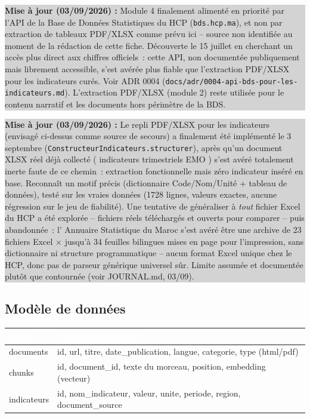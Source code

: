 \documentclass[11pt,a4paper]{article}
\newcommand{\tblhead}[1]{\textcolor{white}{\textbf{#1}}}
\newcommand{\majcadrage}[1]{%
\par\vspace{0.35cm}
\noindent\colorbox{lightgrey}{%
\begin{minipage}{\dimexpr\linewidth-2\fboxsep}
\vspace{0.15cm}
\textbf{\color{gold}Mise \`a jour (03/09/2026) :} #1
\vspace{0.15cm}
\end{minipage}%
}
\vspace{0.35cm}
}
\begin{document}
\majcadrage{Module 4 finalement aliment\'e en priorit\'e par l'API de la Base de Donn\'ees Statistiques du HCP (\texttt{bds.hcp.ma}), et non par extraction de tableaux PDF/XLSX comme pr\'evu ici -- source non identifi\'ee au moment de la r\'edaction de cette fiche. D\'ecouverte le 15 juillet en cherchant un acc\`es plus direct aux chiffres officiels~: cette API, non document\'ee publiquement mais librement accessible, s'est av\'er\'ee plus fiable que l'extraction PDF/XLSX pour les indicateurs cur\'es. Voir ADR 0004 (\texttt{docs/adr/0004-api-bds-pour-les-indicateurs.md}). L'extraction PDF/XLSX (module 2) reste utilis\'ee pour le contenu narratif et les documents hors p\'erim\`etre de la BDS.}

\majcadrage{Le repli PDF/XLSX pour les indicateurs (envisag\'e ci-dessus comme source de secours) a finalement \'et\'e impl\'ement\'e le 3 septembre (\texttt{ConstructeurIndicateurs.structurer}), apr\`es qu'un document XLSX r\'eel d\'ej\`a collect\'e (\guillemotleft{} indicateurs trimestriels EMO \guillemotright{}) s'est av\'er\'e totalement inerte faute de ce chemin~: extraction fonctionnelle mais z\'ero indicateur ins\'er\'e en base. Reconna\^it un motif pr\'ecis (dictionnaire Code/Nom/Unit\'e + tableau de donn\'ees), test\'e sur les vraies donn\'ees (1728 lignes, valeurs exactes, aucune r\'egression sur le jeu de fiabilit\'e). Une tentative de g\'en\'eraliser \`a \emph{tout} fichier Excel du HCP a \'et\'e explor\'ee -- fichiers r\'eels t\'el\'echarg\'es et ouverts pour comparer -- puis abandonn\'ee~: l'\guillemotleft{} Annuaire Statistique du Maroc \guillemotright{} s'est av\'er\'e \^etre une archive de 23 fichiers Excel $\times$ jusqu'\`a 34 feuilles bilingues mises en page pour l'impression, sans dictionnaire ni structure programmatique -- aucun format Excel unique chez le HCP, donc pas de parseur g\'en\'erique universel s\^ur. Limite assum\'ee et document\'ee plut\^ot que contourn\'ee (voir JOURNAL.md, 03/09).}

\subsection{Mod\`ele de donn\'ees}
\begin{longtable}{@{}p{3.2cm}p{12cm}@{}}
\rowcolor{navy}
\tblhead{Table} & \tblhead{Champs principaux} \\
\midrule
\endhead
documents & id, url, titre, date\_publication, langue, categorie, type (html/pdf) \\
chunks & id, document\_id, texte du morceau, position, embedding (vecteur) \\
indicateurs & id, nom\_indicateur, valeur, unite, periode, region, document\_source \\
\end{longtable}
\end{document}
